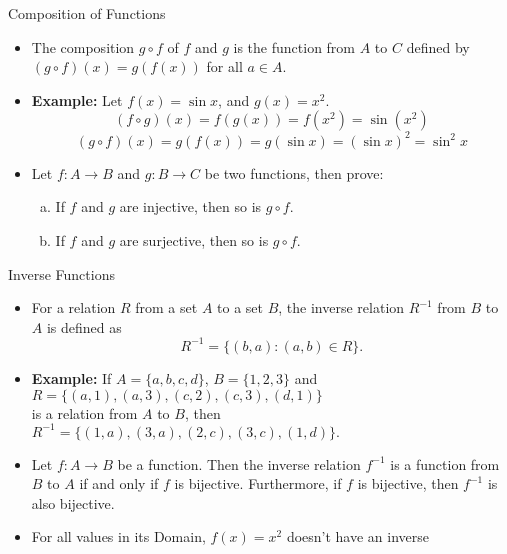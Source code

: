 \documentclass{beamer}
\begin{document}
\begin{frame}{Composition of Functions}
\begin{itemize}
    \item The composition $g \circ f$ of $f$ and $g$ is the function from $A$ to $C$ defined by $(g \circ f )(x) = g( f (x))$ for all $a \in A$.
    \item \textbf{Example:} Let $f(x) = \sin x$, and $g(x) = x^2$.
        $$ (f \circ g)(x) = f(g(x)) = f(x^2) = \sin(x^2) $$
        $$ (g \circ f)(x) = g(f(x)) = g(\sin x) = (\sin x)^2 = \sin^2 x $$
  
    \item Let $f : A \to B$ and $g : B \to C$ be two functions, then prove:
    \begin{enumerate}[(a)]
        \item If $f$ and $g$ are injective, then so is $g \circ f$.
         \item If $f$ and $g$ are surjective, then so is $g \circ f$.
    \end{enumerate}
    
\end{itemize}
\end{frame}


\begin{frame}{Inverse Functions}
\begin{itemize}
    \item For a relation $R$ from a set $A$ to a set $B$, the inverse relation $R^{-1}$ from $B$ to $A$ is defined as
$$R^{-1} = \{(b, a) : (a, b) \in R\}.$$
    \item \textbf{Example:} If $A = \{a, b, c, d\}$, $B = \{1, 2, 3\}$ and
$R = \{(a, 1), (a, 3), (c, 2), (c, 3), (d, 1)\}$\\
is a relation from $A$ to $B$, then
$R^{-1} = \{(1, a), (3, a), (2, c), (3, c), (1, d)\}.$

    \item Let $f : A \to B$ be a function. Then the inverse relation $f^{-1}$ is a function from $B$ to $A$ if and only if $f$ is bijective. Furthermore, if $f$ is bijective, then $f^{-1}$ is also bijective.
   
    \item For all values in its Domain, $f(x)=x^{2}$ doesn't have an inverse 
\end{itemize}
\end{frame}
\end{document}
